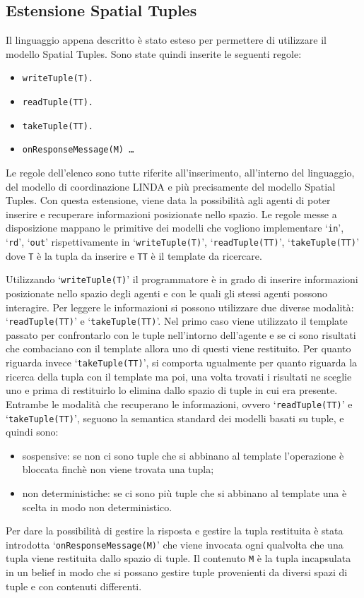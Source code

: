 \subsection{Estensione Spatial Tuples}
Il linguaggio appena descritto è stato esteso per permettere di utilizzare il modello Spatial Tuples. Sono state quindi inserite le seguenti regole:
\begin{itemize}
\item \texttt{writeTuple(T).}
\item \texttt{readTuple(TT).}
\item \texttt{takeTuple(TT).}
\item \texttt{onResponseMessage(M) \impliedBy \ldots}
\end{itemize}
Le regole dell'elenco sono tutte riferite all'inserimento, all'interno del linguaggio, del modello di coordinazione LINDA e più precisamente del modello Spatial Tuples.
Con questa estensione, viene data la possibilità agli agenti di poter inserire e recuperare informazioni posizionate nello spazio. Le regole messe a disposizione mappano le primitive dei modelli che vogliono implementare `\texttt{in}', `\texttt{rd}', `\texttt{out}' rispettivamente in `\texttt{writeTuple(T)}', `\texttt{readTuple(TT)}', `\texttt{takeTuple(TT)}' dove \texttt{T} è la tupla da inserire e \texttt{TT} è il template da ricercare.

Utilizzando `\texttt{writeTuple(T)}' il programmatore è in grado di inserire informazioni posizionate nello spazio degli agenti e con le quali gli stessi agenti possono interagire. Per leggere le informazioni si possono utilizzare due diverse modalità: `\texttt{readTuple(TT)}' e `\texttt{takeTuple(TT)}'. Nel primo caso viene utilizzato il template passato per confrontarlo con le tuple nell'intorno dell'agente e se ci sono risultati che combaciano con il template allora uno di questi viene restituito. Per quanto riguarda invece `\texttt{takeTuple(TT)}', si comporta ugualmente per quanto riguarda la ricerca della tupla con il template ma poi, una volta trovati i risultati ne sceglie uno e prima di restituirlo lo elimina dallo spazio di tuple in cui era presente.
%
Entrambe le modalità che recuperano le informazioni, ovvero `\texttt{readTuple(TT)}' e `\texttt{takeTuple(TT)}', seguono la semantica standard dei modelli basati su tuple, e quindi sono:
\begin{itemize}
\item sospensive: se non ci sono tuple che si abbinano al template l'operazione è bloccata finchè non viene trovata una tupla;
\item non deterministiche: se ci sono più tuple che si abbinano al template una è scelta in modo non deterministico.
\end{itemize}
Per dare la possibilità di gestire la risposta e gestire la tupla restituita è stata introdotta `\texttt{onResponseMessage(M)}' che viene invocata ogni qualvolta che una tupla viene restituita dallo spazio di tuple. Il contenuto \texttt{M} è la tupla incapsulata in un belief in modo che si possano gestire tuple provenienti da diversi spazi di tuple e con contenuti differenti.

